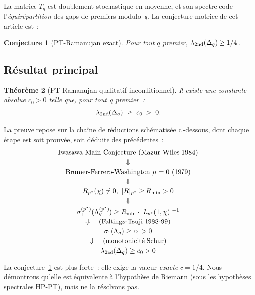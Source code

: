 \documentclass[11pt,a4paper]{article}
\newtheorem{theorem}{Théorème}[section]
\newtheorem{conjecture}[theorem]{Conjecture}
\theoremstyle{definition}
\begin{document}
La matrice $T_q$ est doublement stochastique en moyenne, et son
spectre code l'\emph{équirépartition} des gaps de premiers modulo~$q$.
La conjecture motrice de cet article est~:

\begin{conjecture}[PT-Ramanujan exact]
\label{conj:pt_ram_exact}
Pour tout $q$ premier, $\lambda_{\rm 2nd}(\Delta_q) \geq 1/4$.
\end{conjecture}

\subsection{Résultat principal}

\begin{theorem}[PT-Ramanujan qualitatif inconditionnel]
\label{thm:main}
Il existe une constante absolue $c_0 > 0$ telle que, pour tout~$q$
premier~:
\begin{equation}
  \lambda_{\rm 2nd}(\Delta_q) \;\geq\; c_0 \;>\; 0.
\end{equation}
\end{theorem}

La preuve repose sur la chaîne de réductions schématisée
ci-dessous, dont chaque étape est soit prouvée, soit déduite des
précédentes~:
\begin{equation*}
\begin{array}{c}
\text{Iwasawa Main Conjecture (Mazur-Wiles 1984)}\\[2pt]
\Downarrow \\[2pt]
\text{Brumer-Ferrero-Washington } \mu=0 \text{ (1979)}\\[2pt]
\Downarrow \\[2pt]
R_{p^*}(\chi) \neq 0,\ |R|_{p^*} \geq R_{\min} > 0\\[2pt]
\Downarrow \\[2pt]
\sigma_1^{(p^*)}(\Lambda_q^{(p^*)}) \geq R_{\min}\cdot|L_{p^*}(1,\chi)|^{-1}\\[2pt]
\Downarrow \quad \text{(Faltings-Tsuji 1988-99)} \\[2pt]
\sigma_1(\Lambda_q) \geq c_1 > 0\\[2pt]
\Downarrow \quad \text{(monotonicité Schur)} \\[2pt]
\lambda_{\rm 2nd}(\Delta_q) \geq c_0 > 0
\end{array}
\end{equation*}

La conjecture~\ref{conj:pt_ram_exact} est plus forte~: elle exige la
valeur \emph{exacte} $c = 1/4$. Nous démontrons qu'elle est
équivalente à l'hypothèse de Riemann (sous les hypothèses spectrales
HP-PT), mais ne la résolvons pas.
\end{document}
